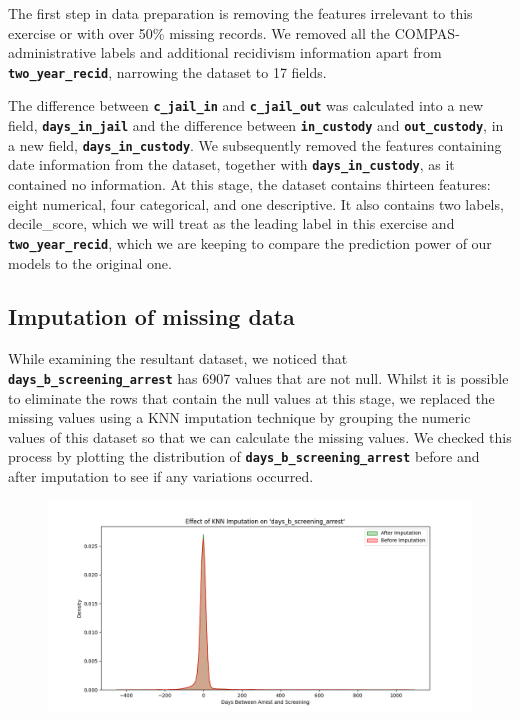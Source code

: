 \documentclass[conference]{IEEEtran}
\begin{document}
	The first step in data preparation is removing the features irrelevant to this exercise or with over 50\% missing records. We removed all the COMPAS-administrative labels and additional recidivism information apart from \textbf{\texttt{two\_year\_recid}}, narrowing the dataset to 17 fields.
	
	The difference between \textbf{\texttt{c\_jail\_in}} and \textbf{\texttt{c\_jail\_out}} was calculated into a new field, \textbf{\texttt{days\_in\_jail}} and the difference between \textbf{\texttt{in\_custody}} and \textbf{\texttt{out\_custody}}, in a new field, \textbf{\texttt{days\_in\_custody}}. We subsequently removed the features containing date information from the dataset, together with \textbf{\texttt{days\_in\_custody}}, as it contained no information. At this stage, the dataset contains thirteen features: eight numerical, four categorical, and one descriptive. It also contains two labels, decile\_score, which we will treat as the leading label in this exercise and \textbf{\texttt{two\_year\_recid}}, which we are keeping to compare the prediction power of our models to the original one.
	
	
	\subsection{Imputation of missing data}
	
	While examining the resultant dataset, we noticed that \textbf{\texttt{days\_b\_screening\_arrest}} has  6907 values that are not null. Whilst it is possible to eliminate the rows that contain the null values at this stage, we replaced the missing values using a KNN imputation technique by grouping the numeric values of this dataset so that we can calculate the missing values. We checked this process by plotting the distribution of \textbf{\texttt{days\_b\_screening\_arrest}} before and after imputation to see if any variations occurred.
	
	\begin{figure}[h!]
		\centering
		\includegraphics[width=0.9\linewidth]{img/imputation}
		\caption[Distribution \textbf{\texttt{days\_b\_screening\_arrest}} of before and after KNN imputation]{}
		\label{fig:imputation}
	\end{figure}
\end{document}
